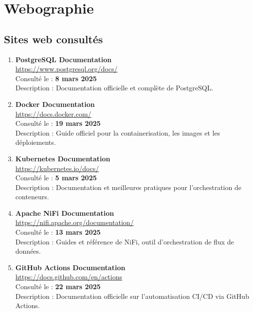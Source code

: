 \chapter*{Webographie}

\section*{Sites web consultés}
\begin{enumerate}
    \item \textbf{PostgreSQL Documentation} \\
    \url{https://www.postgresql.org/docs/} \\
    Consulté le : \textbf{8 mars 2025} \\
    Description : Documentation officielle et complète de PostgreSQL.

    \item \textbf{Docker Documentation} \\
    \url{https://docs.docker.com/} \\
    Consulté le : \textbf{19 mars 2025} \\
    Description : Guide officiel pour la containerisation, les images et les déploiements.

    \item \textbf{Kubernetes Documentation} \\
    \url{https://kubernetes.io/docs/} \\
    Consulté le : \textbf{5 mars 2025} \\
    Description : Documentation et meilleures pratiques pour l’orchestration de conteneurs.

    \item \textbf{Apache NiFi Documentation} \\
    \url{https://nifi.apache.org/documentation/} \\
    Consulté le : \textbf{13 mars 2025} \\
    Description : Guides et référence de NiFi, outil d’orchestration de flux de données.

    \item \textbf{GitHub Actions Documentation} \\
    \url{https://docs.github.com/en/actions} \\
    Consulté le : \textbf{22 mars 2025} \\
    Description : Documentation officielle sur l’automatisation CI/CD via GitHub Actions.


\end{enumerate}
